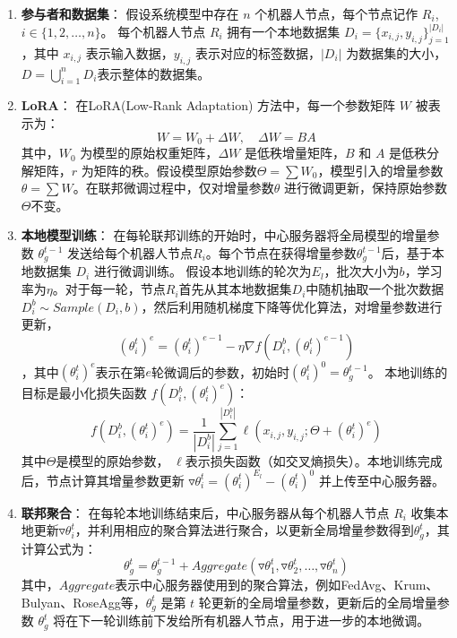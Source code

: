 \documentclass[lettersize,journal]{IEEEtran}
\begin{document}
\begin{enumerate}
    \item \textbf{参与者和数据集}：
    假设系统模型中存在 $n$ 个机器人节点，每个节点记作 $R_i$, $i \in \{1, 2, \ldots, n\}$。 每个机器人节点 $R_i$ 拥有一个本地数据集 $D_i = \{x_{i,j}, y_{i,j}\}_{j=1}^{|D_i|}$，其中 $x_{i,j}$ 表示输入数据，$y_{i,j}$ 表示对应的标签数据，$|D_i|$ 为数据集的大小，$D = \bigcup_{i=1}^{n} D_i$表示整体的数据集。

    \item \textbf{LoRA}：
    在LoRA(Low-Rank Adaptation) 方法中，每一个参数矩阵 $W$ 被表示为：
    \[
    W = W_0 + \Delta W, \quad \Delta W = BA
    \]
    其中，$W_0$ 为模型的原始权重矩阵，$\Delta W$ 是低秩增量矩阵，$B$ 和 $A$ 是低秩分解矩阵，$r$ 为矩阵的秩。假设模型原始参数$\Theta = \sum {W_0}$，模型引入的增量参数$\theta = \sum {W}$。在联邦微调过程中，仅对增量参数$\theta$ 进行微调更新，保持原始参数$\Theta$不变。
    
    \item \textbf{本地模型训练}：
    在每轮联邦训练的开始时，中心服务器将全局模型的增量参数 $\theta_g^{t-1}$ 发送给每个机器人节点$R_i$。每个节点在获得增量参数$\theta_g^{t-1}$后，基于本地数据集 $D_i$ 进行微调训练。
    假设本地训练的轮次为$E_l$，批次大小为$b$，学习率为$\eta$。对于每一轮，节点$R_i$首先从其本地数据集$D_i$中随机抽取一个批次数据$D_i^b \sim Sample(D_i, b)$，然后利用随机梯度下降等优化算法，对增量参数进行更新，
    \[
    (\theta_i^{t})^e = (\theta_i^{t})^{e-1} - \eta \nabla f(D_i^b, (\theta_i^{t})^{e-1})\]
    ，其中$(\theta_i^{t})^e$表示在第$e$轮微调后的参数，初始时$(\theta_i^{t})^0 = \theta_g^{t-1}$。
    本地训练的目标是最小化损失函数 $f(D_i^b, (\theta_i^{t})^e)$：
    \[
    f(D_i^b, (\theta_i^{t})^e) = \frac{1}{|D_i^b|} \sum_{j=1}^{|D_i^b|} \ell(x_{i,j}, y_{i,j}; \Theta + (\theta_i^{t})^e)
    \]
    其中$\Theta$是模型的原始参数， $\ell$表示损失函数（如交叉熵损失）。本地训练完成后，节点计算其增量参数更新 $\triangledown \theta_i^t = (\theta_i^t)^{E_l} - (\theta_i^t)^0$ 并上传至中心服务器。
    \item \textbf{联邦聚合}：
    在每轮本地训练结束后，中心服务器从每个机器人节点 $R_i$ 收集本地更新$\triangledown \theta_i^t$，并利用相应的聚合算法进行聚合，以更新全局增量参数得到$\theta_g^t$，其计算公式为：
    \[
    \theta_g^t = \theta_g^{t-1} + Aggregate(\triangledown \theta_1^t, \triangledown \theta_2^t, \dots, \triangledown \theta_n^t)
    \]
    其中，$Aggregate$表示中心服务器使用到的聚合算法，例如FedAvg、Krum、Bulyan、RoseAgg等，$\theta_g^t$ 是第 $t$ 轮更新的全局增量参数，更新后的全局增量参数 $\theta_g^t$ 将在下一轮训练前下发给所有机器人节点，用于进一步的本地微调。
\end{enumerate}
\end{document}
